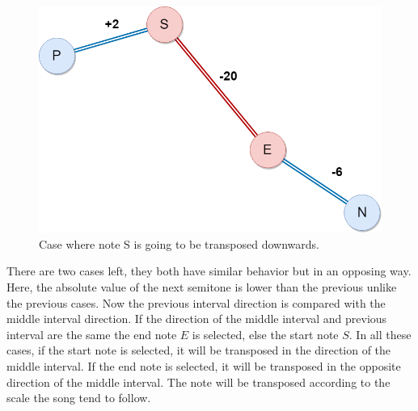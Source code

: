 \begin{figure}[H]
	\includegraphics[width=\linewidth]{Fotos/np_mutation/Case2.png}
	\caption{Case where note S is going to be transposed downwards.}
	\label{fig:npmut_case2}
\end{figure}

There are two cases left, they both have similar behavior but in an opposing way. Here, the absolute value of the next semitone is lower than the previous unlike the previous cases. Now the previous interval direction is compared with the middle interval direction. If the direction of the middle interval and previous interval are the same the end note $E$ is selected, else the start note $S$. In all these cases, if the start note is selected, it will be transposed in the direction of the middle interval. If the end note is selected, it will be transposed in the opposite direction of the middle interval. The note will be transposed according to the scale the song tend to follow.